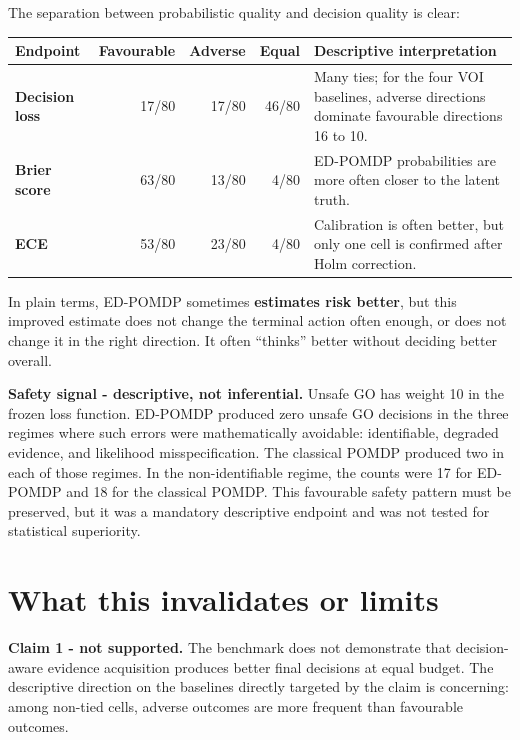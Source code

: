 \documentclass[11pt,a4paper]{article}
\begin{document}
The separation between probabilistic quality and decision quality is clear:

\begin{center}
\begin{tabularx}{\textwidth}{>{\bfseries}l r r r X}
\toprule
Endpoint & Favourable & Adverse & Equal & Descriptive interpretation \\
\midrule
Decision loss & 17/80 & 17/80 & 46/80 & Many ties; for the four VOI baselines, adverse directions dominate favourable directions 16 to 10. \\
Brier score & 63/80 & 13/80 & 4/80 & ED-POMDP probabilities are more often closer to the latent truth. \\
ECE & 53/80 & 23/80 & 4/80 & Calibration is often better, but only one cell is confirmed after Holm correction. \\
\bottomrule
\end{tabularx}
\end{center}

In plain terms, ED-POMDP sometimes \textbf{estimates risk better}, but this improved estimate does not change the terminal action often enough, or does not change it in the right direction. It often ``thinks'' better without deciding better overall.

\begin{tcolorbox}[colback=softgreen,colframe=green!45!black,boxrule=0.7pt,arc=2mm]
\textbf{Safety signal - descriptive, not inferential.} Unsafe GO has weight 10 in the frozen loss function. ED-POMDP produced zero unsafe GO decisions in the three regimes where such errors were mathematically avoidable: identifiable, degraded evidence, and likelihood misspecification. The classical POMDP produced two in each of those regimes. In the non-identifiable regime, the counts were 17 for ED-POMDP and 18 for the classical POMDP. This favourable safety pattern must be preserved, but it was a mandatory descriptive endpoint and was not tested for statistical superiority.
\end{tcolorbox}

\section*{What this invalidates or limits}

\begin{tcolorbox}[colback=softred,colframe=red!60!black,boxrule=0.7pt,arc=2mm]
\textbf{Claim 1 - not supported.} The benchmark does not demonstrate that decision-aware evidence acquisition produces better final decisions at equal budget. The descriptive direction on the baselines directly targeted by the claim is concerning: among non-tied cells, adverse outcomes are more frequent than favourable outcomes.
\end{tcolorbox}
\end{document}

